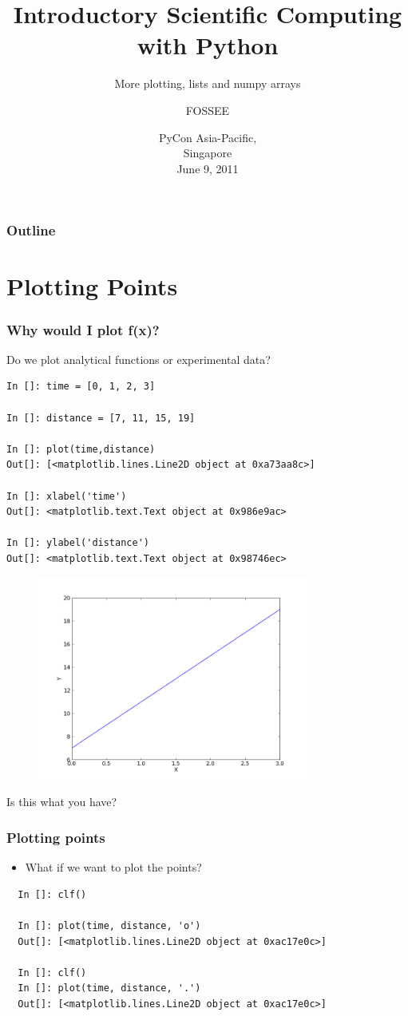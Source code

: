 \documentclass[14pt,compress]{beamer}
\title[Interactive Plotting]{Introductory Scientific Computing with
Python}
\subtitle{More plotting, lists and numpy arrays}
\author[Prabhu] {FOSSEE}
\institute[FOSSEE -- IITB] {Department of Aerospace Engineering\\IIT Bombay}
\date[] {PyCon Asia-Pacific,\\
Singapore\\
June 9, 2011
}
\newcounter{time}
\begin{document}
\begin{frame}
  \titlepage
\end{frame}

\begin{frame}
  \frametitle{Outline}
  \tableofcontents
\end{frame}

\section{Plotting Points}
\begin{frame}[fragile]
\frametitle{Why would I plot f(x)?}
Do we plot analytical functions or experimental data?
\begin{small}
\begin{lstlisting}
In []: time = [0, 1, 2, 3]

In []: distance = [7, 11, 15, 19]

In []: plot(time,distance)
Out[]: [<matplotlib.lines.Line2D object at 0xa73aa8c>]

In []: xlabel('time')
Out[]: <matplotlib.text.Text object at 0x986e9ac>

In []: ylabel('distance')
Out[]: <matplotlib.text.Text object at 0x98746ec>
\end{lstlisting}
\end{small}
\end{frame}

\begin{frame}[fragile]
\begin{figure}
\includegraphics[width=3.5in]{data/straightline.png}
\end{figure}
\alert{Is this what you have?}
\end{frame}

\begin{frame}[fragile]
\frametitle{Plotting points}
\begin{itemize}
\item What if we want to plot the points?
\end{itemize}
\begin{lstlisting}
  In []: clf()

  In []: plot(time, distance, 'o')
  Out[]: [<matplotlib.lines.Line2D object at 0xac17e0c>]

  In []: clf()
  In []: plot(time, distance, '.')
  Out[]: [<matplotlib.lines.Line2D object at 0xac17e0c>]
\end{lstlisting}
\end{frame}
\end{document}
